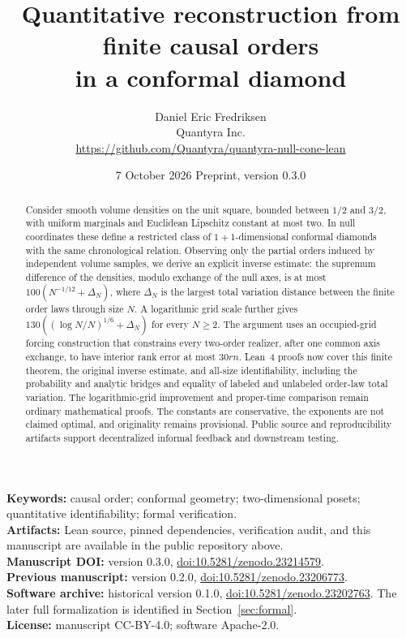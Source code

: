 \documentclass[11pt]{article}
\title{Quantitative reconstruction from finite causal orders\\in a conformal diamond}
\author{Daniel Eric Fredriksen\\Quantyra Inc.\\\url{https://github.com/Quantyra/quantyra-null-cone-lean}}
\date{7 October 2026 \quad Preprint, version 0.3.0}
\theoremstyle{remark}
\begin{document}
\maketitle
\begin{abstract}
Consider smooth volume densities on the unit square, bounded between
$1/2$ and $3/2$, with uniform marginals and Euclidean Lipschitz constant at
most two. In null coordinates these define a restricted class of
$1+1$-dimensional conformal diamonds with the same chronological relation.
Observing only the partial orders induced by independent volume samples,
we derive an explicit inverse estimate: the supremum difference of the
densities, modulo exchange of the null axes, is at most
$100(N^{-1/12}+\Delta_N)$, where $\Delta_N$ is the largest total variation
distance between the finite order laws through size $N$. A logarithmic
grid scale further gives $130((\log N/N)^{1/6}+\Delta_N)$ for every
$N\ge2$. The argument
uses an occupied-grid forcing construction that constrains every
two-order realizer, after one common axis exchange, to have interior
rank error at most $30rn$. Lean~4 proofs now cover this finite theorem,
the original inverse estimate, and all-size identifiability, including
the probability and analytic bridges and equality of labeled and
unlabeled order-law total variation. The logarithmic-grid improvement
and proper-time comparison remain ordinary mathematical proofs.
The constants are conservative, the exponents are not claimed optimal,
and originality remains provisional. Public source and reproducibility
artifacts support decentralized informal feedback and downstream testing.
\end{abstract}

\noindent\textbf{Keywords:} causal order; conformal geometry; two-dimensional
posets; quantitative identifiability; formal verification.\\
\textbf{Artifacts:} Lean source, pinned dependencies, verification audit,
and this manuscript are available in the public repository above.\\
\textbf{Manuscript DOI:} version 0.3.0,
\href{https://doi.org/10.5281/zenodo.23214579}{doi:10.5281/zenodo.23214579}.\\
\textbf{Previous manuscript:} version 0.2.0,
\href{https://doi.org/10.5281/zenodo.23206773}{doi:10.5281/zenodo.23206773}.\\
\textbf{Software archive:} historical version 0.1.0,
\href{https://doi.org/10.5281/zenodo.23202763}{doi:10.5281/zenodo.23202763}.
The later full formalization is identified in Section~\ref{sec:formal}.\\
\textbf{License:} manuscript CC-BY-4.0; software Apache-2.0.
\end{document}
